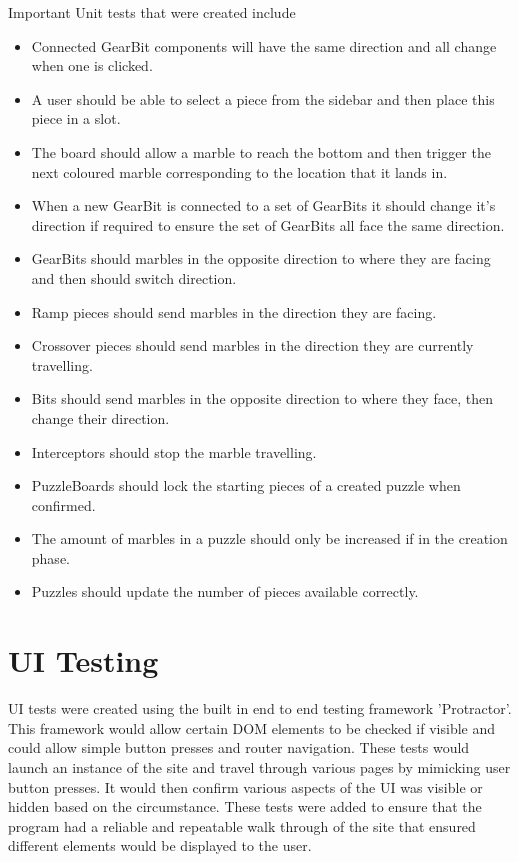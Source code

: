 \documentclass{l4proj}
\begin{document}
Important Unit tests that were created include
\begin{itemize}
    \item Connected GearBit components will have the same direction and all change when one is clicked.
    \item A user should be able to select a piece from the sidebar and then place this piece in a slot.
    \item The board should allow a marble to reach the bottom and then trigger the next coloured marble corresponding to the location that it lands in.
    \item When a new GearBit is connected to a set of GearBits it should change it's direction if required to ensure the set of GearBits all face the same direction.
    \item GearBits should marbles in the opposite direction to where they are facing and then should switch direction.
    \item Ramp pieces should send marbles in the direction they are facing.
    \item Crossover pieces should send marbles in the direction they are currently travelling.
    \item Bits should send marbles in the opposite direction to where they face, then change their direction.
    \item Interceptors should stop the marble travelling.
    \item PuzzleBoards should lock the starting pieces of a created puzzle when confirmed.
    \item The amount of marbles in a puzzle should only be increased if in the creation phase.
    \item Puzzles should update the number of pieces available correctly.
\end{itemize}

\section{UI Testing}
UI tests were created using the built in end to end testing framework 'Protractor'. This framework would allow certain DOM elements to be checked if visible and could allow simple button presses and router navigation. These tests would launch an instance of the site and travel through various pages by mimicking user button presses. It would then confirm various aspects of the UI was visible or hidden based on the circumstance. These tests were added to ensure that the program had a reliable and repeatable walk through of the site that ensured different elements would be displayed to the user. 
\end{document}
